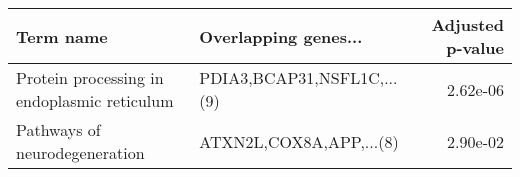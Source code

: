 \begin{tabular}{llr}
\toprule
                                  Term name &       Overlapping genes... &  Adjusted p-value \\
\midrule
Protein processing in endoplasmic reticulum & PDIA3,BCAP31,NSFL1C,...(9) &          2.62e-06 \\
              Pathways of neurodegeneration &    ATXN2L,COX8A,APP,...(8) &          2.90e-02 \\
\bottomrule
\end{tabular}
